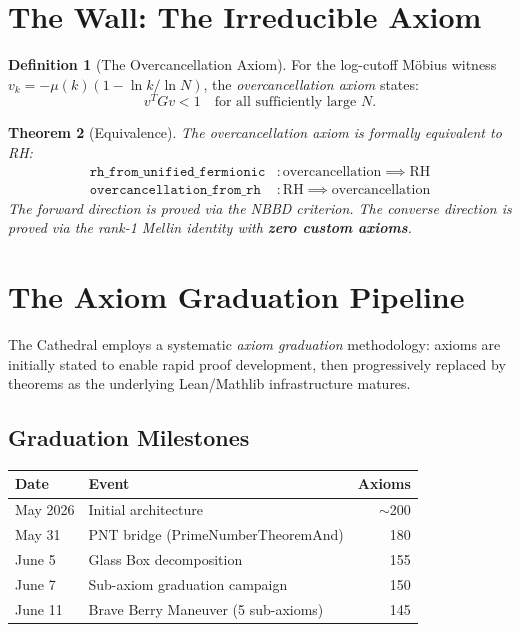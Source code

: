 \documentclass[11pt,a4paper]{article}
\newtheorem{theorem}{Theorem}[section]
\theoremstyle{definition}
\newtheorem{definition}[theorem]{Definition}
\newcommand{\lean}[1]{\texttt{#1}}
\newcommand{\RH}{\mathrm{RH}}
\begin{document}
\section{The Wall: The Irreducible Axiom}
\label{sec:wall}

\begin{definition}[The Overcancellation Axiom]
For the log-cutoff M\"obius witness $v_k = -\mu(k)(1 - \ln k / \ln N)$,
the \emph{overcancellation axiom} states:
\[
  v^T G v < 1 \quad \text{for all sufficiently large } N.
\]
\end{definition}

\begin{theorem}[Equivalence]\label{thm:wall}
The overcancellation axiom is formally equivalent to RH:
\begin{align}
  \lean{rh\_from\_unified\_fermionic} &: \text{overcancellation} \implies \RH \\
  \lean{overcancellation\_from\_rh}  &: \RH \implies \text{overcancellation}
\end{align}
The forward direction is proved via the NBBD criterion.
The converse direction is proved via the rank-1 Mellin identity
with \textbf{zero custom axioms}.
\end{theorem}

\section{The Axiom Graduation Pipeline}
\label{sec:graduation}

The Cathedral employs a systematic \emph{axiom graduation} methodology:
axioms are initially stated to enable rapid proof development, then
progressively replaced by theorems as the underlying Lean/Mathlib
infrastructure matures.

\subsection{Graduation Milestones}

\begin{center}
\begin{tabular}{@{}llr@{}}
\toprule
\textbf{Date} & \textbf{Event} & \textbf{Axioms} \\
\midrule
May 2026 & Initial architecture & $\sim$200 \\
May 31   & PNT bridge (PrimeNumberTheoremAnd) & 180 \\
June 5   & Glass Box decomposition & 155 \\
June 7   & Sub-axiom graduation campaign & 150 \\
June 11  & Brave Berry Maneuver (5 sub-axioms) & 145 \\
\bottomrule
\end{tabular}
\end{center}
\end{document}
